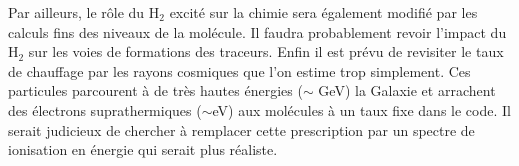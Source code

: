 \documentclass[11pt,a4paper]{article}
\begin{document}
\begin{spacing}{0.98}
Par ailleurs, le rôle du $\mathrm{H}_2$ excité sur la chimie sera également modifié par les calculs fins des niveaux de la molécule. Il faudra probablement revoir l'impact du $\mathrm{H}_2$ sur les voies de formations des traceurs. Enfin il est prévu de revisiter le taux de chauffage par les rayons cosmiques que l'on estime trop simplement. Ces particules parcourent à de très hautes énergies ($\sim$ GeV) la Galaxie et arrachent des électrons suprathermiques ($\sim$eV) aux molécules à un taux fixe dans le code. Il serait judicieux de chercher à remplacer cette prescription par un spectre de ionisation en énergie qui serait plus réaliste. 



\newpage


\end{spacing}
\end{document}
